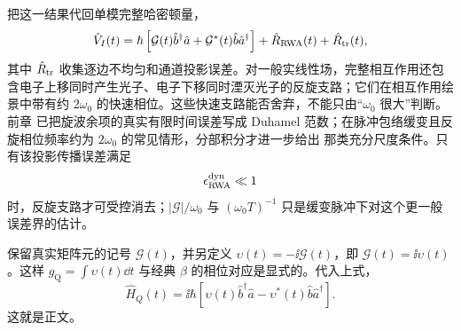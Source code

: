 \begin{derivation}[共振单模近场的量子耦合]
把这一结果代回单模完整哈密顿量，
\[
\hat V_I(t)
=
\hbar
\left[
\mathcal G(t)\hat b^\dagger\hat a
+
\mathcal G^*(t)\hat b\hat a^\dagger
\right]
+\hat R_{\rm RWA}(t)
+\hat R_{\rm tr}(t),
\]
其中 $\hat R_{\rm tr}$ 收集逐边不均匀和通道投影误差。对一般实线性场，完整相互作用还包含电子上移同时产生光子、电子下移同时湮灭光子的反旋支路；它们在相互作用绘景中带有约 $2\omega_0$ 的快速相位。这些快速支路能否舍弃，不能只由“$\omega_0$ 很大”判断。前章 已把旋波余项的真实有限时间误差写成 Duhamel 范数；在脉冲包络缓变且反旋相位频率约为 $2\omega_0$ 的常见情形，分部积分才进一步给出 那类充分尺度条件。只有该投影传播误差满足
\[
\epsilon_{\rm RWA}^{\rm dyn}\ll1
\]
时，反旋支路才可受控消去；$|\mathcal G|/\omega_0$ 与 $(\omega_0T)^{-1}$ 只是缓变脉冲下对这个更一般误差界的估计。

保留真实矩阵元的记号 $\mathcal G(t)$，并另定义 $\upsilon(t)=-\ii\mathcal G(t)$，即 $\mathcal G(t)=\ii\upsilon(t)$。这样 $g_{\mathrm Q}=\int\upsilon(t)\dd t$ 与经典 $\beta$ 的相位对应是显式的。代入上式，
\[
\boxed{
\hat H_Q(t)
=
\ii\hbar
\left[
\upsilon(t)\hat b^\dagger\hat a
-
\upsilon^*(t)\hat b\hat a^\dagger
\right].
}
\]
这就是正文。
\end{derivation}

























